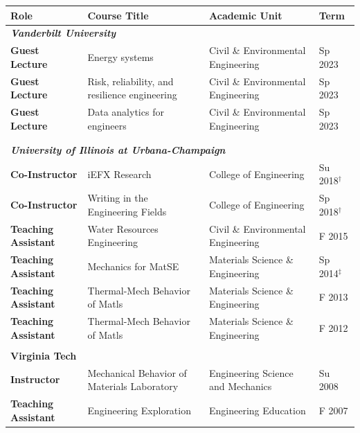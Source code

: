 \documentclass{article}[12pt]
\begin{document}
	\begin{tabularx}{\textwidth}{lXXl}
		Role & Course Title & Academic Unit & Term \\
		\midrule
		\multicolumn{4}{l}{\textbf{\textit{Vanderbilt University}}}\\
		\textbf{Guest Lecture} & Energy systems & Civil \& Environmental Engineering & Sp 2023 \\
		\textbf{Guest Lecture} & Risk, reliability, and resilience engineering & Civil \& Environmental Engineering & Sp 2023 \\
		\textbf{Guest Lecture} & Data analytics for engineers & Civil \& Environmental Engineering & Sp 2023 \\
		\\
		\\
		\multicolumn{4}{l}{\textbf{\textit{University of Illinois at Urbana-Champaign}}}\\
		\textbf{Co-Instructor} & iEFX Research & College of Engineering & Su 2018\small{$^{\dagger}$} \\ 
		\textbf{Co-Instructor} & Writing in the Engineering Fields & College of Engineering & Sp 2018\small{$^{\dagger}$} \\
		\textbf{Teaching Assistant} & Water Resources Engineering & Civil \& Environmental Engineering & F 2015 \\
		\textbf{Teaching Assistant} & Mechanics for MatSE & Materials Science \& Engineering & Sp 2014\small{$^{\ddagger}$} \\
		\textbf{Teaching Assistant} & Thermal-Mech Behavior of Matls & Materials Science \& Engineering & F 2013 \\
		\textbf{Teaching Assistant} & Thermal-Mech Behavior of Matls & Materials Science \& Engineering & F 2012 \\
		\\
		\multicolumn{4}{l}{\textbf{Virginia Tech}}\\
		\textbf{Instructor} & Mechanical Behavior of Materials Laboratory & Engineering Science and Mechanics & Su 2008 \\ 
		\textbf{Teaching Assistant} & Engineering Exploration & Engineering Education & F 2007 
	\end{tabularx}
	
	
\end{document}
